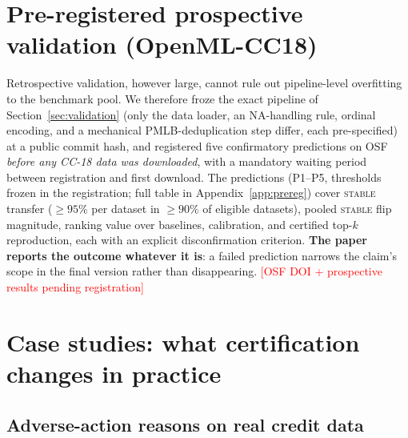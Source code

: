 \documentclass[10pt]{article}
\newcommand{\stab}{\textsc{stable}}
\newcommand{\osfpending}{\textcolor{red}{[OSF DOI + prospective results pending registration]}}
\begin{document}
\section{Pre-registered prospective validation (OpenML-CC18)}
\label{sec:prospective}

Retrospective validation, however large, cannot rule out pipeline-level overfitting to
the benchmark pool. We therefore froze the exact pipeline of
Section~\ref{sec:validation} (only the data loader, an NA-handling rule, ordinal
encoding, and a mechanical PMLB-deduplication step differ, each pre-specified) at a
public commit hash, and registered five confirmatory predictions on OSF \emph{before any
CC-18 data was downloaded}, with a mandatory waiting period between registration and
first download. The predictions (P1--P5, thresholds frozen in the registration; full
table in Appendix~\ref{app:prereg}) cover \stab{} transfer ($\ge 95\%$ per dataset in
$\ge 90\%$ of eligible datasets), pooled \stab{} flip magnitude, ranking value over
baselines, calibration, and certified top-$k$ reproduction, each with an explicit
disconfirmation criterion. \textbf{The paper reports the outcome whatever it is}: a
failed prediction narrows the claim's scope in the final version rather than
disappearing. \osfpending

\section{Case studies: what certification changes in practice}
\label{sec:cases}

\subsection{Adverse-action reasons on real credit data}
\label{sec:credit}
\end{document}
